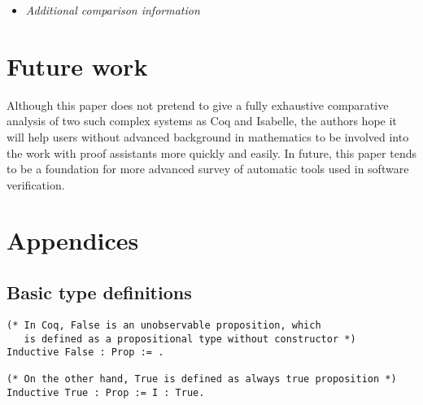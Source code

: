 \documentclass[article]{aaltoseries}
\begin{document}
\begin{itemize}
  \item \textit{Additional comparison information}
      
    
  
\end{itemize}



\section{Future work}
\label{sec:future_work}

Although this paper does not pretend to give a fully exhaustive comparative analysis of two such complex systems as Coq and Isabelle, the authors hope it will help users without advanced background in mathematics to be involved into the work with proof assistants more quickly and easily. In future, this paper tends to be a foundation for more advanced survey of automatic tools used in software verification.






\newpage
\appendix
\section*{Appendices}
\renewcommand{\thesubsection}{A.\arabic{subsection}}

\subsection{Basic type definitions}
\label{apx:type_definitions}

\begin{lstlisting}[language=coq,
  caption={Basic \texttt{Prop} types definitions in Coq},
  label={ex_typedef_prop_coq}]
(* In Coq, False is an unobservable proposition, which
   is defined as a propositional type without constructor *)
Inductive False : Prop := .

(* On the other hand, True is defined as always true proposition *)
Inductive True : Prop := I : True.
\end{lstlisting}
\end{document}

